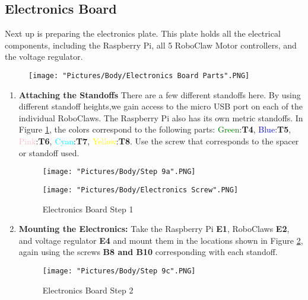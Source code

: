 \documentclass[12pt]{article}
\begin{document}
\subsection{Electronics Board}

Next up is preparing the electronics plate. This plate holds all the electrical components, including the Raspberry Pi, all 5 RoboClaw Motor controllers, and the voltage regulator. 

\begin{figure}[H]
	\centering
	\texttt{[image: "Pictures/Body/Electronics Board Parts".PNG]}
\end{figure}



\begin{enumerate}
\item \textbf{Attaching the Standoffs} There are a few different standoffs here. By using different standoff heights,we gain access to the micro USB port on each of the individual RoboClaws. The Raspberry Pi also has its own metric standoffs. In Figure \ref{standoffs}, the colors correspond to the following parts: \textcolor{green}{Green}:\textbf{T4}, \textcolor{blue}{Blue}:\textbf{T5}, \textcolor{pink}{Pink}:\textbf{T6}, \textcolor{cyan}{Cyan}:\textbf{T7}, \textcolor{yellow}{Yellow}:\textbf{T8}. Use the screw that corresponds to the spacer or standoff used.

\begin{figure}[H]
  \centering
  \begin{minipage}[b]{0.50\textwidth}
    \texttt{[image: "Pictures/Body/Step 9a".PNG]}
  \end{minipage}
  \hfill
  \begin{minipage}[b]{0.35\textwidth}
    \texttt{[image: "Pictures/Body/Electronics Screw".PNG]}
  \end{minipage}

  \caption{Electronics Board Step 1}
  \label{standoffs}
\end{figure}

\item \textbf{Mounting the Electronics:} Take the Raspberry Pi \textbf{E1}, RoboClaws \textbf{E2}, and voltage regulator \textbf{E4} and mount them in the locations shown in Figure \ref{electronics board 2}, again using the screws \textbf{B8 and B10} corresponding with each standoff. 

\begin{figure}[H]
\centering	
  \texttt{[image: "Pictures/Body/Step 9c".PNG]}
  \caption{Electronics Board Step 2}
  \label{electronics board 2}
\end{figure}


\end{enumerate}
\end{document}
